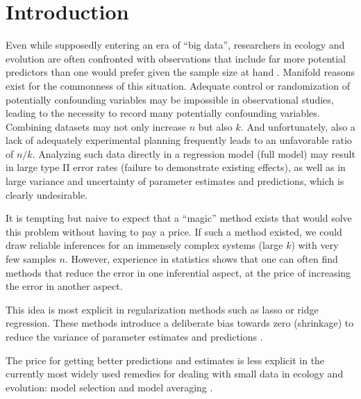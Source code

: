 \documentclass[5p]{elsarticle}
\begin{document}
\section{Introduction}

Even while supposedly entering an era of ``big data'', researchers in ecology and evolution are often confronted with observations that include far more potential predictors than one would prefer given the sample size at hand \citep[rules of thumb suggest at least 10 events $n$ per predictor variable $k$. See, e.g.,][]{Harrell-Regressionmodelingstrategies-2001}. Manifold reasons exist for the commonness of this situation. Adequate control or randomization of potentially confounding variables may be impossible in observational studies, leading to the necessity to record many potentially confounding variables. Combining datasets may not only increase $n$ but also $k$. And unfortunately, also a lack of adequately experimental planning frequently leads to an unfavorable ratio of $n/k$. Analyzing such data directly in a regression model (full model) may result in large type II error rates (failure to demonstrate existing effects), as well as in large variance and uncertainty of parameter estimates and predictions, which is clearly undesirable. 

It is tempting but naive to expect that a ``magic'' method exists that would solve this problem without having to pay a price. If such a method existed, we could draw reliable inferences for an immensely complex systems (large $k$) with very few samples $n$. However, experience in statistics shows that one can often find methods that reduce the error in one inferential aspect, at the price of increasing the error in another aspect. 

This idea is most explicit in regularization methods such as lasso or ridge regression. These methods introduce a deliberate bias towards zero (shrinkage) to reduce the variance of parameter estimates and predictions \citep[e.g.,]{Tibshirani-RegressionShrinkageand-1996, Morrissey-Insearchbest-2014}. 

The price for getting better predictions and estimates is less explicit in the currently most widely used remedies for dealing with small data in ecology and evolution: model selection and model averaging \citep[e.g.,][]{Johnson-Modelselectionin-2004, Burnham-Modelselectionand-2002}. 
\end{document}
